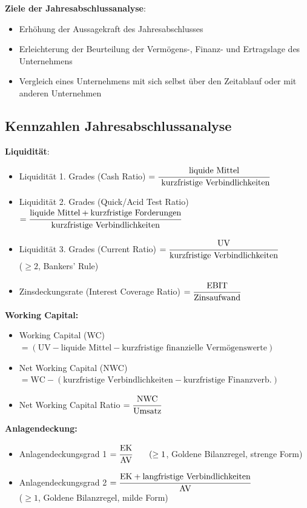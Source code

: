 \textbf{Ziele der Jahresabschlussanalyse}:
\begin{itemize}
	\item Erhöhung der Aussagekraft des Jahresabschlusses
	\item Erleichterung der Beurteilung der Vermögens-, Finanz- und Ertragslage des Unternehmens
	\item Vergleich eines Unternehmens mit sich selbst über den Zeitablauf oder mit anderen Unternehmen
\end{itemize}

\subsection{Kennzahlen Jahresabschlussanalyse}
\textbf{Liquidität}:
\begin{itemize}
	\item Liquidität 1. Grades (Cash Ratio) $=\cfrac{\text{liquide Mittel}}{\text{ kurzfristige Verbindlichkeiten}}$	
	\item Liquidität 2. Grades (Quick/Acid Test Ratio) $=\cfrac{\text{liquide Mittel}+\text{kurzfristige Forderungen}}{\text{kurzfristige Verbindlichkeiten}}$
	\item Liquidität 3. Grades (Current Ratio) $=\cfrac{\text{UV}}{\text{kurzfristige Verbindlichkeiten}}$ \\($\geq 2$, Bankers' Rule)
	\item Zinsdeckungsrate (Interest Coverage Ratio) $=\cfrac{\text{EBIT}}{\text{Zinsaufwand}}$
\end{itemize}
	
\textbf{Working Capital:}
\begin{itemize}
	\item Working Capital (WC) $=(\text{UV} -\text{liquide Mittel} -  \text{kurzfristige finanzielle Vermögenswerte})$	
	\item Net Working Capital (NWC) $=\text{WC}-(\text{kurzfristige Verbindlichkeiten}-\text{kurzfristige Finanzverb.})$
	\item Net Working Capital Ratio $=\cfrac{\text{NWC}}{\text{Umsatz}}$
\end{itemize}

\textbf{Anlagendeckung:}
\begin{itemize}
	\item Anlagendeckungsgrad 1 $=\cfrac{\text{EK}}{\text{AV}}\qquad (\geq 1$, Goldene Bilanzregel, strenge Form)
	\item Anlagendeckungsgrad 2 $=\cfrac{\text{EK}+\text{langfristige Verbindlichkeiten}}{\text{AV}}$\\ ($\geq 1$, Goldene Bilanzregel, milde Form)
\end{itemize}

